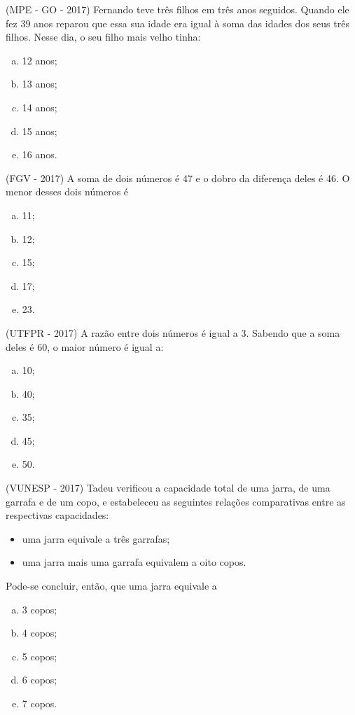 \begin{exer}
 (MPE - GO - 2017) Fernando teve três filhos em três anos seguidos. Quando ele fez 39 anos reparou que essa sua idade era igual à soma das idades dos seus três filhos. Nesse dia, o seu filho mais velho tinha:
\begin{enumerate}[a)]
\item 12 anos;
\item 13 anos;
\item 14 anos;
\item 15 anos;
\item 16 anos.
\end{enumerate}
\end{exer}

\begin{exer}
 (FGV - 2017) A soma de dois números é 47 e o dobro da diferença deles é 46. O menor desses dois números é
\begin{enumerate}[a)]
\item 11;
\item 12;
\item 15;
\item 17;
\item 23.
\end{enumerate}
\end{exer}

\begin{exer}
 (UTFPR - 2017) A razão entre dois números é igual a 3. Sabendo que a soma deles é 60, o maior número é igual a:
\begin{enumerate}[a)]
\item 10;
\item 40;
\item 35;
\item 45;
\item 50.
\end{enumerate}
\end{exer}

\begin{exer}
 (VUNESP - 2017) Tadeu verificou a capacidade total de uma jarra, de uma garrafa e de um copo, e estabeleceu as seguintes relações comparativas entre as respectivas capacidades:
\begin{itemize}
\item uma jarra equivale a três garrafas;
\item uma jarra mais uma garrafa equivalem a oito copos.
\end{itemize}
Pode-se concluir, então, que uma jarra equivale a
\begin{enumerate}[a)]
\item 3 copos;
\item 4 copos;
\item 5 copos;
\item 6 copos;
\item 7 copos.
\end{enumerate}
\end{exer}

